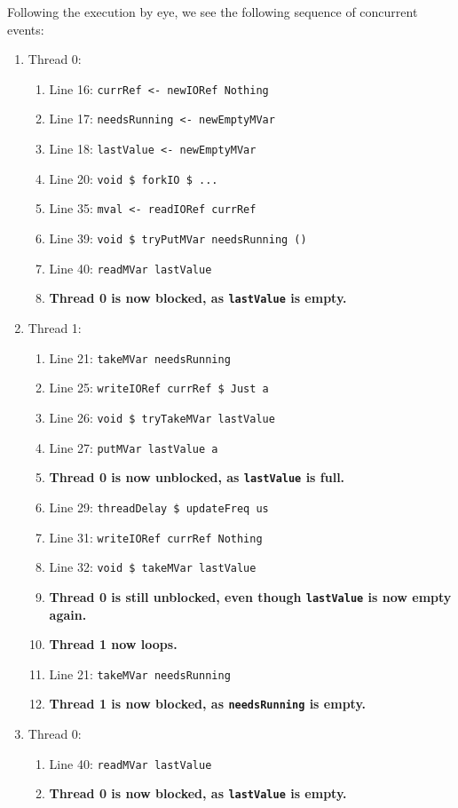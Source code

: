Following the execution by eye, we see the following sequence of
concurrent events:

\begin{enumerate}
\item Thread 0:
  \begin{enumerate}
  \item Line 16: \verb|currRef <- newIORef Nothing|
  \item Line 17: \verb|needsRunning <- newEmptyMVar|
  \item Line 18: \verb|lastValue <- newEmptyMVar|
  \item Line 20: \verb|void $ forkIO $ ...|
  \item Line 35: \verb|mval <- readIORef currRef|
  \item Line 39: \verb|void $ tryPutMVar needsRunning ()|
  \item Line 40: \verb|readMVar lastValue|
  \item \textbf{Thread 0 is now blocked, as \texttt{lastValue} is empty.}
  \end{enumerate}
\item Thread 1:
  \begin{enumerate}
  \item Line 21: \verb|takeMVar needsRunning|
  \item Line 25: \verb|writeIORef currRef $ Just a|
  \item Line 26: \verb|void $ tryTakeMVar lastValue|
  \item Line 27: \verb|putMVar lastValue a|
  \item \textbf{Thread 0 is now unblocked, as \texttt{lastValue} is full.}
  \item Line 29: \verb|threadDelay $ updateFreq us|
  \item Line 31: \verb|writeIORef currRef Nothing|
  \item Line 32: \verb|void $ takeMVar lastValue|
  \item \textbf{Thread 0 is still unblocked, even though \texttt{lastValue} is now empty again.}
  \item \textbf{Thread 1 now loops.}
  \item Line 21: \verb|takeMVar needsRunning|
  \item \textbf{Thread 1 is now blocked, as \texttt{needsRunning} is empty.}
  \end{enumerate}
\item Thread 0:
  \begin{enumerate}
  \item Line 40: \verb|readMVar lastValue|
  \item \textbf{Thread 0 is now blocked, as \texttt{lastValue} is empty.}
  \end{enumerate}
\end{enumerate}

